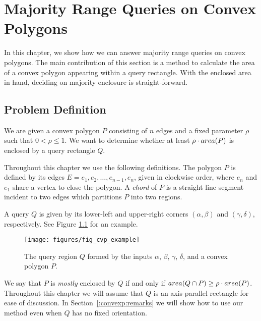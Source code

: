 \chapter{Majority Range Queries on Convex Polygons}
\label{:convexp}

In this chapter, we show how we can answer majority range queries on convex polygons. The main contribution of this section is a method to calculate the area of a convex polygon appearing within a query rectangle. With the enclosed area in hand, deciding on majority enclosure is straight-forward.


\section{Problem Definition}
\label{:convexp:problem-definition}

\begin{problem}
We are given a convex polygon $P$ consisting of $n$ edges and a fixed parameter $\rho$ such that $0 < \rho \leq 1$. We want to determine whether at least $\rho \cdot area(P)$ is enclosed by a query rectangle $Q$.
\end{problem}

Throughout this chapter we use the following definitions. The polygon $P$ is defined by its edges $E = e_1, e_2, \ldots, e_{n-1}, e_n$, given in clockwise order, where $e_n$ and $e_1$ share a vertex to close the polygon.  A \emph{chord} of $P$ is a straight line segment incident to two edges which partitions $P$ into two regions.

A query $Q$ is given by its lower-left and upper-right corners $(\alpha, \beta)$ and $(\gamma, \delta)$, respectively. See Figure \ref{fig:convexp:example} for an example.

\begin{figure}
\begin{center}
  \texttt{[image: figures/fig\_cvp\_example]}
  \caption[A convex polygon $P$ and query box $Q$]{The query region $Q$ formed by the inputs $\alpha$, $\beta$, $\gamma$,  $\delta$, and a convex polygon $P$.}
  \label{fig:convexp:example}
\end{center}
\end{figure}

We say that $P$ is \emph{mostly} enclosed by $Q$ if and only if $area(Q \cap P) \geq \rho \cdot area(P)$. Throughout this chapter we will assume that $Q$ is an axis-parallel rectangle for ease of discussion. In Section~\ref{:convexp:remarks} we will show how to use our method even when $Q$ has no fixed orientation.

